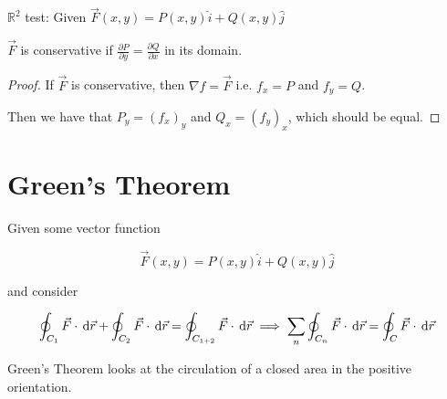 \begin{lemma}
	$\mathbb{R}^2$ test: Given $\vec F(x, y) = P(x, y) \hat i + Q(x, y) \hat j$

	$\vec F$ is conservative if $\frac{\partial P}{\partial y} = \frac{\partial Q}{\partial x}$ in its domain.
\end{lemma}

\begin{proof}
	If $\vec F$ is conservative, then $\nabla f = \vec F$ i.e. $f_x = P$ and $f_y = Q$.

	Then we have that $P_y = (f_x)_y$ and $Q_x = (f_y)_x$, which should be equal.
\end{proof}

\section{Green's Theorem}

Given some vector function

\begin{equation}
	\vec F(x, y) = P(x, y) \hat i + Q(x, y) \hat j
\end{equation}

and consider

\begin{equation}
	\oint_{C_1} \vec F \cdot \D \vec r + \oint_{C_2} \vec F \cdot \D \vec r = \oint_{C_{1+2}} \vec F \cdot \D \vec r \implies \sum_n \oint_{C_n} \vec F \cdot \D \vec r = \oint_C \vec F \cdot \D \vec r
\end{equation}

Green's Theorem looks at the circulation of a closed area in the positive orientation. 